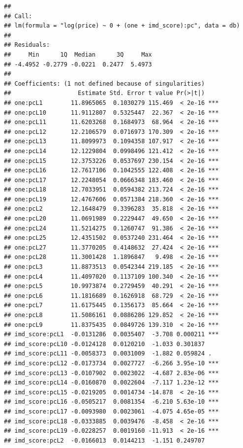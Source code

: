 \documentclass[
]{book}
\begin{document}
\begin{verbatim}
## 
## Call:
## lm(formula = "log(price) ~ 0 + (one + imd_score):pc", data = db)
## 
## Residuals:
##     Min      1Q  Median      3Q     Max 
## -4.4952 -0.2779 -0.0221  0.2477  5.4973 
## 
## Coefficients: (1 not defined because of singularities)
##                   Estimate Std. Error t value Pr(>|t|)    
## one:pcL1        11.8965065  0.1030279 115.469  < 2e-16 ***
## one:pcL10       11.9112807  0.5325447  22.367  < 2e-16 ***
## one:pcL11       11.6203268  0.1684973  68.964  < 2e-16 ***
## one:pcL12       12.2106579  0.0716973 170.309  < 2e-16 ***
## one:pcL13       11.8099973  0.1094358 107.917  < 2e-16 ***
## one:pcL14       12.1229804  0.0998496 121.412  < 2e-16 ***
## one:pcL15       12.3753226  0.0537697 230.154  < 2e-16 ***
## one:pcL16       12.7617106  0.1042555 122.408  < 2e-16 ***
## one:pcL17       12.2248054  0.0666348 183.460  < 2e-16 ***
## one:pcL18       12.7033951  0.0594382 213.724  < 2e-16 ***
## one:pcL19       12.4767606  0.0571384 218.360  < 2e-16 ***
## one:pcL2        12.1648479  0.3396283  35.818  < 2e-16 ***
## one:pcL20       11.0691989  0.2229447  49.650  < 2e-16 ***
## one:pcL24       11.5214275  0.1260747  91.386  < 2e-16 ***
## one:pcL25       12.4351502  0.0537240 231.464  < 2e-16 ***
## one:pcL27       11.3770205  0.4148632  27.424  < 2e-16 ***
## one:pcL28       11.3001428  1.1896847   9.498  < 2e-16 ***
## one:pcL3        11.8873513  0.0542344 219.185  < 2e-16 ***
## one:pcL4        11.4097020  0.1137109 100.340  < 2e-16 ***
## one:pcL5        10.9973874  0.2729459  40.291  < 2e-16 ***
## one:pcL6        11.1816689  0.1626918  68.729  < 2e-16 ***
## one:pcL7        11.6175445  0.1356173  85.664  < 2e-16 ***
## one:pcL8        11.5086161  0.0886286 129.852  < 2e-16 ***
## one:pcL9        11.8375435  0.0849726 139.310  < 2e-16 ***
## imd_score:pcL1  -0.0131286  0.0035407  -3.708 0.000211 ***
## imd_score:pcL10 -0.0124128  0.0120210  -1.033 0.301837    
## imd_score:pcL11 -0.0058373  0.0031009  -1.882 0.059824 .  
## imd_score:pcL12 -0.0173734  0.0027727  -6.266 3.95e-10 ***
## imd_score:pcL13 -0.0107902  0.0023022  -4.687 2.83e-06 ***
## imd_score:pcL14 -0.0160870  0.0022604  -7.117 1.23e-12 ***
## imd_score:pcL15 -0.0219205  0.0014734 -14.878  < 2e-16 ***
## imd_score:pcL16 -0.0505217  0.0081354  -6.210 5.63e-10 ***
## imd_score:pcL17 -0.0093980  0.0023061  -4.075 4.65e-05 ***
## imd_score:pcL18 -0.0333885  0.0039476  -8.458  < 2e-16 ***
## imd_score:pcL19 -0.0228257  0.0019160 -11.913  < 2e-16 ***
## imd_score:pcL2  -0.0166013  0.0144213  -1.151 0.249707    

\end{verbatim}
\end{document}
